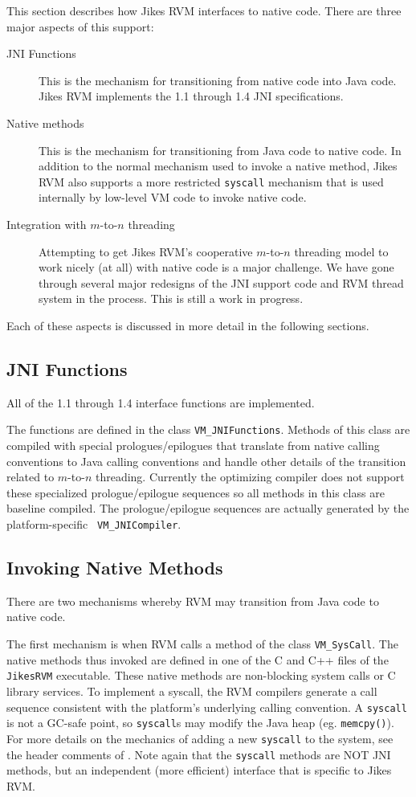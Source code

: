 %

This section describes how Jikes RVM interfaces to native code. There
are three major aspects of this support:
\begin{description}
\item[JNI Functions] This is the mechanism for transitioning from
native code into Java code.  Jikes RVM implements the 1.1 through 1.4
JNI specifications.  
\item[Native methods] This is the mechanism for transitioning from
Java code to native code. In addition to the normal mechanism used to
invoke a native method, Jikes RVM also supports a more restricted
\texttt{syscall} mechanism that is used internally by low-level VM code to
invoke native code. 
\item[Integration with $m$-to-$n$ threading] Attempting to get Jikes RVM's
cooperative $m$-to-$n$ threading model to work nicely (at all) with native
code is a major challenge. We have gone through several major
redesigns of the JNI support code and RVM thread system in the
process. This is still a work in progress.
\end{description}
Each of these aspects is discussed in more detail in the following
sections. 

\subsection{JNI Functions}
All of the 1.1 through 1.4  interface functions
are implemented.

The functions are defined in the class {\tt VM\_JNIFunctions}.  Methods
of this class are compiled with special prologues/epilogues that
translate from native calling conventions to Java calling conventions
and handle other details of the transition related to $m$-to-$n$
threading.  Currently the optimizing compiler 
does not support these specialized prologue/epilogue sequences so all
methods in this class are baseline compiled.  The prologue/epilogue
sequences are actually generated by the platform-specific {\tt
VM\_JNICompiler}. 

\subsection{Invoking Native Methods}
There are two mechanisms whereby RVM may transition from Java code to native
code.

%
The first mechanism is when RVM calls a method of the class {\tt VM\_SysCall}.
The native methods thus invoked are defined in one of the
C and C++ files of the {\tt JikesRVM} executable. 
These native methods are non-blocking system calls or C library 
services.  To implement a syscall, the RVM compilers generate a call
sequence consistent with the platform's underlying calling convention.
A {\tt syscall} is not a GC-safe point, so {\tt syscall}s may modify the
Java heap (eg. {\tt memcpy()}). For more details on the mechanics of adding a
new \texttt{syscall} to the system, see the header comments of 
.  Note again that the
{\tt syscall} methods are NOT JNI methods, but an independent (more
efficient) interface that is specific to Jikes RVM.   

